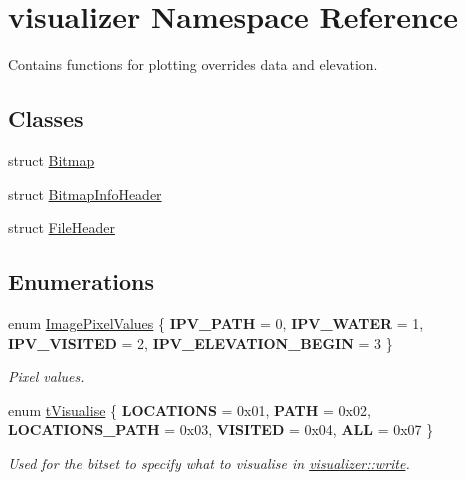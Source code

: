 \hypertarget{namespacevisualizer}{}\section{visualizer Namespace Reference}
\label{namespacevisualizer}


Contains functions for plotting overrides data and elevation.  


\subsection*{Classes}
\begin{DoxyCompactItemize}
\item 
struct \mbox{\hyperlink{structvisualizer_1_1_bitmap}{Bitmap}}
\item 
struct \mbox{\hyperlink{structvisualizer_1_1_bitmap_info_header}{Bitmap\+Info\+Header}}
\item 
struct \mbox{\hyperlink{structvisualizer_1_1_file_header}{File\+Header}}
\end{DoxyCompactItemize}
\subsection*{Enumerations}
\begin{DoxyCompactItemize}
\item 
\mbox{\label{namespacevisualizer_af36cea222d0362709a55b17474afcc8a}} 
enum \mbox{\hyperlink{namespacevisualizer_af36cea222d0362709a55b17474afcc8a}{Image\+Pixel\+Values}} \{ {\bfseries I\+P\+V\+\_\+\+P\+A\+TH} = 0, 
{\bfseries I\+P\+V\+\_\+\+W\+A\+T\+ER} = 1, 
{\bfseries I\+P\+V\+\_\+\+V\+I\+S\+I\+T\+ED} = 2, 
{\bfseries I\+P\+V\+\_\+\+E\+L\+E\+V\+A\+T\+I\+O\+N\+\_\+\+B\+E\+G\+IN} = 3
 \}
\begin{DoxyCompactList}\small\item\em Pixel values. \end{DoxyCompactList}\item 
\mbox{\label{namespacevisualizer_ad08cef44b6dbff468f08c62effe9cb8f}} 
enum \mbox{\hyperlink{namespacevisualizer_ad08cef44b6dbff468f08c62effe9cb8f}{t\+Visualise}} \{ \newline
{\bfseries L\+O\+C\+A\+T\+I\+O\+NS} = 0x01, 
{\bfseries P\+A\+TH} = 0x02, 
{\bfseries L\+O\+C\+A\+T\+I\+O\+N\+S\+\_\+\+P\+A\+TH} = 0x03, 
{\bfseries V\+I\+S\+I\+T\+ED} = 0x04, 
\newline
{\bfseries A\+LL} = 0x07
 \}
\begin{DoxyCompactList}\small\item\em Used for the bitset to specify what to visualise in \mbox{\hyperlink{namespacevisualizer_a2f66e38c689ff3c3731faa95739bbf25}{visualizer\+::write}}. \end{DoxyCompactList}\end{DoxyCompactItemize}
